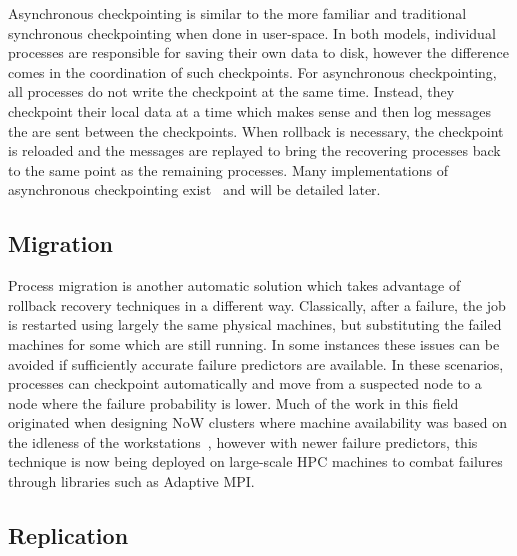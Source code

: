 Asynchronous checkpointing is similar to the more familiar and traditional synchronous 
checkpointing when done in user-space. In both models, individual processes are 
responsible for saving their own data to disk, however the difference comes in the 
coordination of such checkpoints. For asynchronous checkpointing, all processes do not 
write the checkpoint at the same time. Instead, they checkpoint their local data at a 
time which makes sense and then log messages the are sent between the checkpoints. When 
rollback is necessary, the checkpoint is reloaded and the messages are replayed to 
bring the recovering processes back to the same point as the remaining processes. Many 
implementations of asynchronous checkpointing 
exist~\cite{Bouteiller:2010vo, Rao:1999us} and will be detailed later.

\subsection{Migration}
\label{subsec:background:types:migration}

Process migration is another automatic solution which takes advantage 
of rollback recovery techniques in a different way. Classically, after a failure, the 
job is restarted using largely the same physical machines, but substituting the failed 
machines for some which are still running. In some instances these issues can be 
avoided if sufficiently accurate failure predictors are available. In these scenarios, 
processes can checkpoint automatically and move from a suspected node to a node where 
the failure probability is lower. Much of the work in this field originated when 
designing NoW clusters where machine availability was based on the idleness of the 
workstations~\cite{Wang:1995gn, Litzkow:1992ve, Duell:tr}, however with newer failure 
predictors, this technique is now being deployed on large-scale HPC machines
to combat failures through libraries such as Adaptive MPI.

\subsection{Replication}
\label{subsec:background:types:replication}

